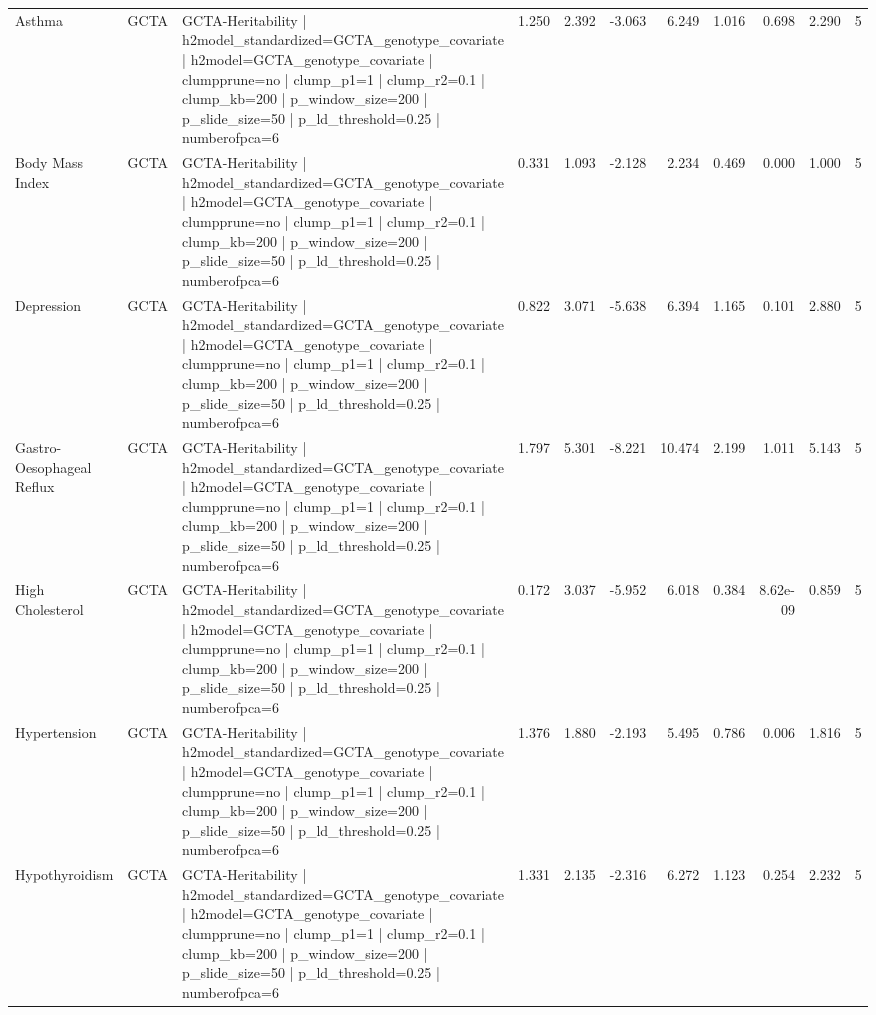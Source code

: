 \begin{landscape}
\begin{longtable}{p{2.4cm}p{1.8cm}p{6.0cm}rrrrrrrr}
Asthma & GCTA & GCTA-Heritability | h2model\_standardized=GCTA\_genotype\_covariate | h2model=GCTA\_genotype\_covariate | clumpprune=no | clump\_p1=1 | clump\_r2=0.1 | clump\_kb=200 | p\_window\_size=200 | p\_slide\_size=50 | p\_ld\_threshold=0.25 | numberofpca=6 & 1.250 & 2.392 & -3.063 & 6.249 & 1.016 & 0.698 & 2.290 & 5 \\
Body Mass Index & GCTA & GCTA-Heritability | h2model\_standardized=GCTA\_genotype\_covariate | h2model=GCTA\_genotype\_covariate | clumpprune=no | clump\_p1=1 | clump\_r2=0.1 | clump\_kb=200 | p\_window\_size=200 | p\_slide\_size=50 | p\_ld\_threshold=0.25 | numberofpca=6 & 0.331 & 1.093 & -2.128 & 2.234 & 0.469 & 0.000 & 1.000 & 5 \\
Depression & GCTA & GCTA-Heritability | h2model\_standardized=GCTA\_genotype\_covariate | h2model=GCTA\_genotype\_covariate | clumpprune=no | clump\_p1=1 | clump\_r2=0.1 | clump\_kb=200 | p\_window\_size=200 | p\_slide\_size=50 | p\_ld\_threshold=0.25 | numberofpca=6 & 0.822 & 3.071 & -5.638 & 6.394 & 1.165 & 0.101 & 2.880 & 5 \\
Gastro-Oesophageal Reflux & GCTA & GCTA-Heritability | h2model\_standardized=GCTA\_genotype\_covariate | h2model=GCTA\_genotype\_covariate | clumpprune=no | clump\_p1=1 | clump\_r2=0.1 | clump\_kb=200 | p\_window\_size=200 | p\_slide\_size=50 | p\_ld\_threshold=0.25 | numberofpca=6 & 1.797 & 5.301 & -8.221 & 10.474 & 2.199 & 1.011 & 5.143 & 5 \\
High Cholesterol & GCTA & GCTA-Heritability | h2model\_standardized=GCTA\_genotype\_covariate | h2model=GCTA\_genotype\_covariate | clumpprune=no | clump\_p1=1 | clump\_r2=0.1 | clump\_kb=200 | p\_window\_size=200 | p\_slide\_size=50 | p\_ld\_threshold=0.25 | numberofpca=6 & 0.172 & 3.037 & -5.952 & 6.018 & 0.384 & 8.62e-09 & 0.859 & 5 \\
Hypertension & GCTA & GCTA-Heritability | h2model\_standardized=GCTA\_genotype\_covariate | h2model=GCTA\_genotype\_covariate | clumpprune=no | clump\_p1=1 | clump\_r2=0.1 | clump\_kb=200 | p\_window\_size=200 | p\_slide\_size=50 | p\_ld\_threshold=0.25 | numberofpca=6 & 1.376 & 1.880 & -2.193 & 5.495 & 0.786 & 0.006 & 1.816 & 5 \\
Hypothyroidism & GCTA & GCTA-Heritability | h2model\_standardized=GCTA\_genotype\_covariate | h2model=GCTA\_genotype\_covariate | clumpprune=no | clump\_p1=1 | clump\_r2=0.1 | clump\_kb=200 | p\_window\_size=200 | p\_slide\_size=50 | p\_ld\_threshold=0.25 | numberofpca=6 & 1.331 & 2.135 & -2.316 & 6.272 & 1.123 & 0.254 & 2.232 & 5 \\

\end{longtable}
\end{landscape}
